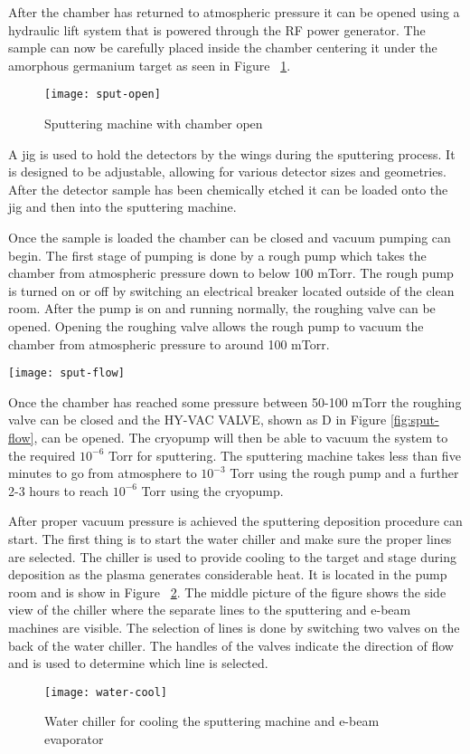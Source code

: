 After the chamber has returned to atmospheric pressure it can be opened using a hydraulic lift system that is powered through the RF power generator.
The sample can now be carefully placed inside the chamber centering it under the amorphous germanium target as seen in Figure ~\ref{fig:sput-open}.
\begin{figure}[htpb]
\centering
\texttt{[image: sput-open]}
\caption{Sputtering machine with chamber open}
\label{fig:sput-open}
\end{figure}
A jig is used to hold the detectors by the wings during the sputtering process.
It is designed to be adjustable, allowing for various detector sizes and geometries.
After the detector sample has been chemically etched it can be loaded onto the jig and then into the sputtering machine.

Once the sample is loaded the chamber can be closed and vacuum pumping can begin.
The first stage of pumping is done by a rough pump which takes the chamber from atmospheric pressure down to below 100 mTorr.
The rough pump is turned on or off by switching an electrical breaker located outside of the clean room.
After the pump is on and running normally, the roughing valve can be opened.
Opening the roughing valve allows the rough pump to vacuum the chamber from atmospheric pressure to around 100 mTorr.

\begin{sidewaysfigure}
\texttt{[image: sput-flow]}
\caption{This is a diagram of the Sputtering machine vacuum and gas system. Each valve is connected to a pressurized air line.}
\label{fig:sput-flow}
\end{sidewaysfigure}

Once the chamber has reached some pressure between 50-100 mTorr the roughing valve can be closed and the HY-VAC VALVE, shown as D in Figure \ref{fig:sput-flow}, can be opened.
The cryopump will then be able to vacuum the system to the required $10^{-6}$ Torr for sputtering.
The sputtering machine takes less than five minutes to go from atmosphere to $10^{-3}$ Torr using the rough pump and a further 2-3 hours to reach $10^{-6}$ Torr using the cryopump.

After proper vacuum pressure is achieved the sputtering deposition procedure can start.
The first thing is to start the water chiller and make sure the proper lines are selected.
The chiller is used to provide cooling to the target and stage during deposition as the plasma generates considerable heat.
It is located in the pump room and is show in Figure ~\ref{fig:water-cool}.
The middle picture of the figure shows the side view of the chiller where the separate lines to the sputtering and e-beam machines are visible.
The selection of lines is done by switching two valves on the back of the water chiller.
The handles of the valves indicate the direction of flow and is used to determine which line is selected.
\begin{figure}[htpb]
\centering
\texttt{[image: water-cool]}
\caption{Water chiller for cooling the sputtering machine and e-beam evaporator}
\label{fig:water-cool}
\end{figure}

